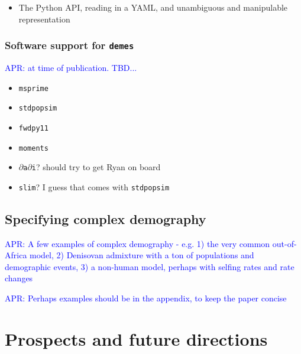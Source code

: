 \documentclass[11pt]{article}
\newcommand{\msprime}[0]{\texttt{msprime}}
\newcommand{\stdpopsim}[0]{\texttt{stdpopsim}}
\newcommand{\demes}[0]{\texttt{demes}}
\newcommand{\moments}[0]{\texttt{moments}}
\newcommand{\dadi}[0]{\texttt{$\partial$a$\partial$i}}
\newcommand{\fwdpy}[0]{\texttt{fwdpy11}}
\newcommand{\slim}[0]{\texttt{slim}}
\newcommand{\aprcomment}[1]{{\textcolor{blue}{APR: #1}}}
\begin{document}
\begin{itemize}
\item The Python API, reading in a YAML, and unambiguous and manipulable representation
\end{itemize}

\subsubsection*{Software support for \demes}
\aprcomment{at time of publication. TBD...}
\begin{itemize}
\item \msprime
\item \stdpopsim
\item \fwdpy
\item \moments
\item \dadi? should try to get Ryan on board
\item \slim? I guess that comes with \stdpopsim
\end{itemize}

\subsection*{Specifying complex demography}

\aprcomment{A few examples of complex demography - e.g. 1) the very common out-of-Africa
model, 2) Denisovan admixture with a ton of populations and demographic events, 3) a
non-human model, perhaps with selfing rates and rate changes}

\aprcomment{Perhaps examples should be in the appendix, to keep the paper concise}

\section*{Prospects and future directions}



\end{document}
